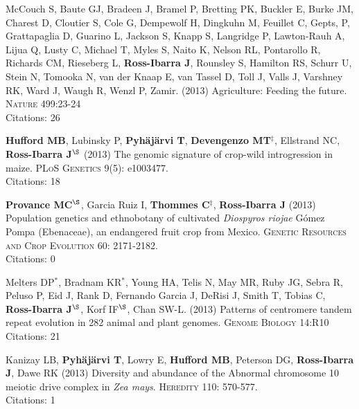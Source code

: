 \documentclass[letterpaper]{article}
\begin{document}
\begin{etaremune}
\item McCouch S, Baute GJ, Bradeen J, Bramel P, Bretting PK, Buckler E, Burke JM, Charest D, Cloutier S, Cole G, Dempewolf H, Dingkuhn M, Feuillet C, Gepts, P, Grattapaglia D, Guarino L, Jackson S, Knapp S, Langridge P, Lawton-Rauh A, Lijua Q, Lusty C, Michael T, Myles S, Naito K, Nelson RL, Pontarollo R, Richards CM, Rieseberg L, {\bf Ross-Ibarra J}, Rounsley S, Hamilton RS, Schurr U, Stein N, Tomooka N, van der Knaap E, van Tassel D, Toll J, Valls J, Varshney RK, Ward J, Waugh R, Wenzl P, Zamir. (2013) Agriculture: Feeding the future. \textsc{Nature} 499:23-24
\\Citations: 26\\

\item {\bf Hufford MB}, Lubinsky P, {\bf Pyh\"aj\"arvi T}, {\bf Devengenzo MT}$^\ddagger$, Ellstrand NC, {\bf Ross-Ibarra J}$^\S$ (2013) The genomic signature of crop-wild introgression in maize. \textsc{PLoS Genetics} 9(5): e1003477. %
\\Citations: 18\\

\item {\bf Provance MC}$^\S$, Garcia Ruiz I, {\bf Thommes C}$^\ddagger$, {\bf Ross-Ibarra J} (2013) Population genetics and ethnobotany of cultivated \emph{Diospyros riojae} G\'omez Pompa (Ebenaceae), an endangered fruit crop from Mexico. \textsc{Genetic Resources and Crop Evolution} 60: 2171-2182.
\\Citations: 0\\

\item Melters DP$^*$, Bradnam KR$^*$, Young HA, Telis N, May MR, Ruby JG, Sebra R, Peluso P, Eid J, Rank D, Fernando Garcia J, DeRisi J, Smith T, Tobias C, {\bf Ross-Ibarra J}$^\S$, Korf IF$^\S$, Chan SW-L. (2013) Patterns of centromere tandem repeat evolution in 282 animal and plant genomes. \textsc{Genome Biology} 14:R10 
\\Citations: 21\\

\item Kanizay LB, {\bf Pyh\"aj\"arvi T}, Lowry E, {\bf Hufford MB}, Peterson DG, {\bf Ross-Ibarra J}, Dawe RK (2013) Diversity and abundance of the Abnormal chromosome 10 meiotic drive complex in \emph{Zea mays}. \textsc{Heredity} 110: 570-577.
\\Citations: 1\\


\end{etaremune}
\end{document}
